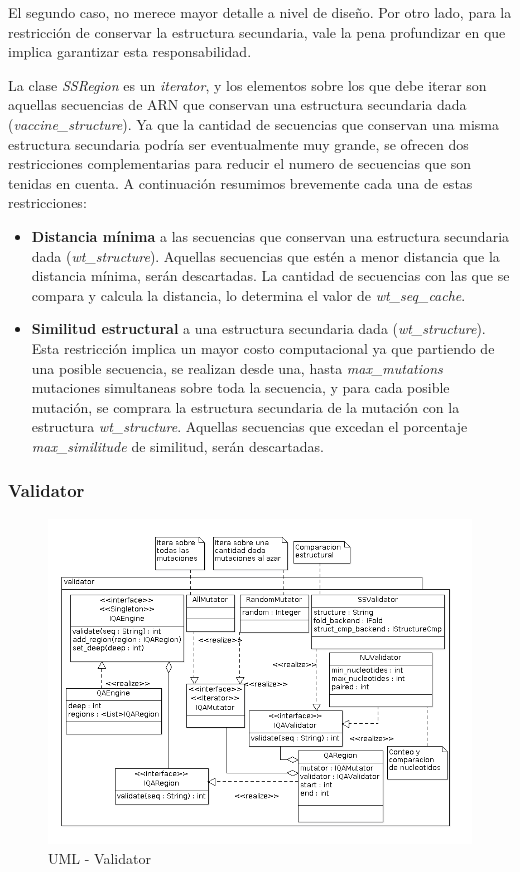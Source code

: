   El segundo caso, no merece mayor detalle a nivel de dise\~no. Por otro lado,
para la restricci\'on de conservar la estructura secundaria, vale la pena
profundizar en que implica garantizar esta responsabilidad.

  La clase \textit{SSRegion} es un \textit{iterator}, y los elementos sobre los
que debe iterar son aquellas secuencias de ARN que conservan una estructura
secundaria dada (\textit{vaccine\_structure}). Ya que la cantidad de secuencias
que conservan una misma estructura secundaria podr\'ia ser eventualmente muy
grande, se ofrecen dos restricciones complementarias para reducir el numero de
secuencias que son tenidas en cuenta. A continuaci\'on resumimos brevemente cada
una de estas restricciones:

  \begin{itemize}
   \item \textbf{Distancia m\'inima} a las secuencias que conservan una
estructura secundaria dada (\textit{wt\_structure}). Aquellas secuencias que
est\'en a menor distancia que la distancia m\'inima, ser\'an descartadas. La
cantidad de secuencias con las que se compara y calcula la distancia, lo
determina el valor de \textit{wt\_seq\_cache}.
  
  \item \textbf{Similitud estructural} a una estructura secundaria dada
(\textit{wt\_structure}). Esta restricci\'on implica un mayor costo
computacional ya que partiendo de una posible secuencia, se realizan desde una,
hasta \textit{max\_mutations} mutaciones simultaneas sobre toda la secuencia, y
para cada posible mutaci\'on, se comprara la estructura secundaria de la
mutaci\'on con la estructura \textit{wt\_structure}. Aquellas secuencias que
excedan el porcentaje \textit{max\_similitude} de similitud, ser\'an
descartadas.
  \end{itemize}

  \subsubsection{Validator}
    \begin{figure}
      \centering
      \includegraphics[scale=0.5]{lld-validator.png}  
      \caption{UML - Validator}
      \label{uml:lld-validator}
    \end{figure}


